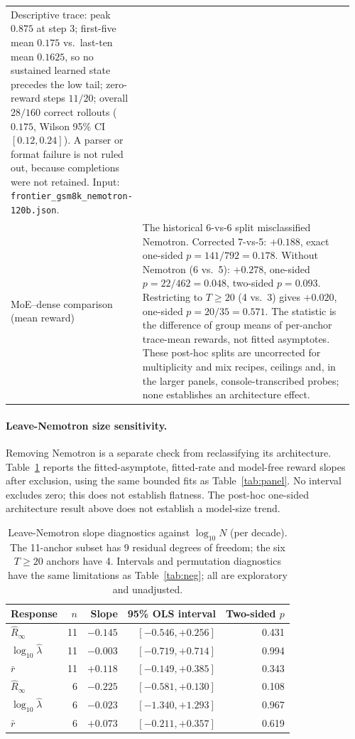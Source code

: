 \documentclass[11pt]{article}
\begin{document}
\begin{longtable}{@{}p{0.30\linewidth}>{\raggedright\arraybackslash}p{0.66\linewidth}@{}}
Descriptive trace: peak $0.875$ at step 3; first-five mean $0.175$ vs.\
last-ten mean $0.1625$, so no sustained learned state precedes the low tail;
zero-reward steps $11/20$; overall $28/160$ correct rollouts ($0.175$, Wilson
95\% CI $[0.12,0.24]$). A parser or format failure is not ruled out, because
completions were not retained. Input:
\nolinkurl{frontier_gsm8k_nemotron-120b.json}. \\
MoE--dense comparison (mean reward) &
The historical 6-vs-6 split misclassified Nemotron. Corrected 7-vs-5:
$+0.188$, exact one-sided $p=141/792=0.178$. Without Nemotron (6 vs.\ 5):
$+0.278$, one-sided $p=22/462=0.048$, two-sided $p=0.093$. Restricting to
$T\ge20$ (4 vs.\ 3) gives $+0.020$, one-sided $p=20/35=0.571$.
The statistic is the difference of group means of per-anchor trace-mean rewards,
not fitted asymptotes. These post-hoc splits are uncorrected for multiplicity
and mix recipes, ceilings and, in the larger panels, console-transcribed probes;
none establishes an architecture effect. \\
\bottomrule
\end{longtable}
\endgroup

\paragraph{Leave-Nemotron size sensitivity.}
Removing Nemotron is a separate check from reclassifying its architecture.
Table~\ref{tab:sensitivity} reports the fitted-asymptote, fitted-rate and
model-free reward slopes after exclusion, using the same bounded fits as
Table~\ref{tab:panel}. No interval excludes zero; this does not establish
flatness. The post-hoc one-sided architecture result above does not establish
a model-size trend.

\begingroup
\small
\begin{longtable}{@{}lrrrr@{}}
\caption{Leave-Nemotron slope diagnostics against $\log_{10}N$ (per decade).
The 11-anchor subset has 9 residual degrees of freedom; the six $T\ge20$
anchors have 4. Intervals and permutation diagnostics have the same limitations
as Table~\ref{tab:neg}; all are exploratory and unadjusted.}
\label{tab:sensitivity}\\
\toprule
Response & $n$ & Slope & 95\% OLS interval & Two-sided $p$ \\
\midrule
\endhead
$\hat R_\infty$ & 11 & $-0.145$ & $[-0.546,+0.256]$ & 0.431 \\
$\log_{10}\hat\lambda$ & 11 & $-0.003$ & $[-0.719,+0.714]$ & 0.994 \\
$\bar r$ & 11 & $+0.118$ & $[-0.149,+0.385]$ & 0.343 \\
$\hat R_\infty$ & 6 & $-0.225$ & $[-0.581,+0.130]$ & 0.108 \\
$\log_{10}\hat\lambda$ & 6 & $-0.023$ & $[-1.340,+1.293]$ & 0.967 \\
$\bar r$ & 6 & $+0.073$ & $[-0.211,+0.357]$ & 0.619 \\
\bottomrule
\end{longtable}
\endgroup
\end{document}
